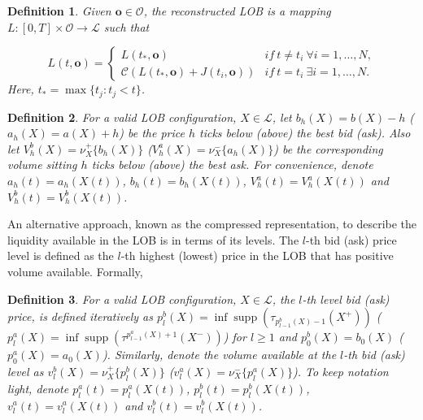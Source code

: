 \documentclass[10pt,a4paper,oneside]{article}
\newcommand{\Bo}{\mathcal{L}}
\newtheorem{definition}{Definition}
\DeclareMathOperator{\support}{supp}
\begin{document}
\begin{definition} Given $\mathbf{o} \in \mathcal{O}$, the reconstructed LOB is a mapping $L : [0, T] \times \mathcal{O} \rightarrow \Bo$ such that 

\begin{equation*}
    L(t, \mathbf{o}) =\begin{cases}
        L(t_*, \mathbf{o}) & if \ t \neq t_i\ \forall i = 1, \dots, N,\\
        \mathcal{C}\left( L(t_*, \mathbf{o}) + J(t_i, \mathbf{o}) \right) & if \ t = t_i \ \exists i = 1, \dots, N.
    \end{cases}
    \label{def:LOB_reconstructor}
\end{equation*}
Here, $t_* = \max\{t_j : t_j < t\}$.
\end{definition}

\begin{definition}
    For a valid LOB configuration, $X \in \mathcal{L}$, let $b_h(X) = b(X) - h$ ($a_h(X) = a(X) + h$) be the price $h$ ticks below (above) the best bid (ask).
     Also let $V^b_h(X) = \nu^+_{X}\{b_{h}(X)\}$ ($V^a_h(X) = \nu^-_{X}\{a_{h}(X)\}$) be the corresponding volume sitting $h$ ticks below (above) the best ask. For convenience, denote $a_h(t) = a_h(X(t))$, $b_h(t) = b_h(X(t))$, $V^a_h(t) = V^a_h(X(t))$ and $V^b_h(t) = V^b_h(X(t))$.
     \label{def:bid_ask_volume_dephts}
\end{definition}

An alternative approach, known as the compressed representation, to describe the liquidity available in the LOB is in terms of its levels. The $l$-th bid (ask) price level is defined as the $l$-th highest (lowest) price in the LOB that has positive volume available. Formally, 

\begin{definition}
    For a valid LOB configuration, $X \in \mathcal{L}$, the $l$-th level bid (ask) price, is defined iteratively as $p^b_l(X) = \inf \support\left(\tau_{p^b_{l - 1}(X) - 1}(X^+) \right)$ ($p^a_l(X) = \inf \support\left(\tau^{p^a_{l - 1}(X) + 1}(X^-) \right)$) for $l \geq 1$ and $p^b_0(X) = b_0(X)$ ($p^a_0(X) = a_0(X)$). Similarly, denote the volume available at the $l$-th bid (ask) level as $v^b_l(X) = \nu^+_{X}\{p^b_l(X)\}$ ($v^a_l(X) = \nu^-_{X}\{p^a_l(X)\}$). To keep notation light, denote $p^a_l(t) = p^a_l(X(t))$, $p^b_l(t) = p^b_l(X(t))$, $v^a_l(t) = v^a_l(X(t))$ and $v^b_l(t) = v^b_l(X(t))$.
    \label{def:bid_ask_volume_levels}
\end{definition}
\end{document}
